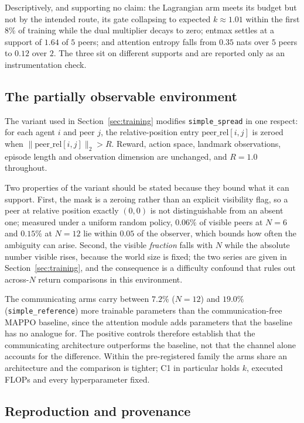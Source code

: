 Descriptively, and supporting no claim: the Lagrangian arm meets its budget but
not by the intended route, its gate collapsing to expected $k \approx 1.01$
within the first $8\%$ of training while the dual multiplier decays to zero;
entmax settles at a support of $1.64$ of $5$ peers; and attention entropy falls
from $0.35$ nats over $5$ peers to $0.12$ over $2$. The three sit on different
supports and are reported only as an instrumentation check.

\subsection{The partially observable environment}
\label{app:env}

The variant used in Section~\ref{sec:training} modifies \texttt{simple\_spread}
in one respect: for each agent $i$ and peer $j$, the relative-position entry
$\text{peer\_rel}[i,j]$ is zeroed when
$\lVert \text{peer\_rel}[i,j] \rVert_2 > R$. Reward, action space, landmark
observations, episode length and observation dimension are unchanged, and
$R{=}1.0$ throughout.

Two properties of the variant should be stated because they bound what it can
support. First, the mask is a zeroing rather than an explicit visibility flag,
so a peer at relative position exactly $(0,0)$ is not distinguishable from an
absent one; measured under a uniform random policy, $0.06\%$ of visible peers
at $N{=}6$ and $0.15\%$ at $N{=}12$ lie within $0.05$ of the observer, which
bounds how often the ambiguity can arise. Second, the visible \emph{fraction}
falls with $N$ while the absolute number visible rises, because the world size
is fixed; the two series are given in Section~\ref{sec:training}, and the
consequence is a difficulty confound that rules out across-$N$ return
comparisons in this environment.

The communicating arms carry between $7.2\%$ ($N{=}12$) and $19.0\%$
(\texttt{simple\_reference}) more trainable parameters than the
communication-free MAPPO baseline, since the attention module adds parameters
that the baseline has no analogue for. The positive controls therefore
establish that the communicating architecture outperforms the baseline, not
that the channel alone accounts for the difference. Within the pre-registered
family the arms share an architecture and the comparison is tighter; C1 in
particular holds $k$, executed FLOPs and every hyperparameter fixed.

\subsection{Reproduction and provenance}
\label{app:repro}

